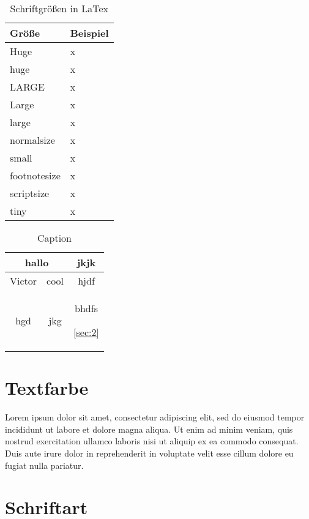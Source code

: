 \documentclass[12pt, a4paper]{article} %
\begin{document}
\begin{table}[h] 
\centering
\begin{tabular}{l | l}
\bf{Gr\"o\ss e} & \bf{Beispiel} \\
\hline 
Huge & x\\
\hline
huge & x\\
\hline
LARGE & x\\
\hline
Large & x\\
\hline 
large & x\\
\hline
normalsize & x\\
\hline
small & x\\
\hline
footnotesize & x\\
\hline
scriptsize & x\\
\hline
tiny & x\\
\end{tabular}
\caption{\label{tab4}Schriftgr\"o\ss en in LaTex }
\end{table}
\begin{table}[h]
    \centering
    \begin{tabular}{|c|c|c|} 
    \hline
       \multicolumn{2}{|c|}{hallo} & jkjk \\
       \hline
       Victor  & cool &  hjdf \\ 
       \hline
      hgd  & jkg &  bhdfs
    
    \ref{sec:2}  
    \end{tabular}
    \caption{Caption}
    \label{tab:my_label}
\end{table}

\section{Textfarbe}


Lorem ipsum dolor sit amet, consectetur adipiscing elit, sed do eiusmod tempor incididunt ut labore et dolore magna aliqua. Ut enim ad minim veniam, quis nostrud exercitation ullamco laboris nisi ut aliquip ex ea commodo consequat. Duis aute irure dolor in reprehenderit in voluptate velit esse cillum dolore eu fugiat nulla pariatur.

\section{Schriftart}
\end{document}
